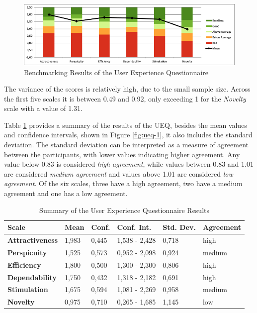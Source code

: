\begin{figure}[htb]
	\includegraphics[width=\textwidth]{figures/ueq-2.png}
  \caption{Benchmarking Results of the User Experience Questionnaire}
  \label{fig:ueq-2}
\end{figure}

The variance of the scores is relatively high, due to the small sample size.
Across the first five scales it is between 0.49 and 0.92, only exceeding 1 for the \emph{Novelty} scale with a value of 1.31.

Table \ref{tab:ueq-summary} provides a summary of the results of the UEQ, besides the mean values and confidence intervals, shown in Figure \ref{fig:ueq-1}, it also includes the standard deviation.
The standard deviation can be interpreted as a measure of agreement between the participants, with lower values indicating higher agreement.
Any value below 0.83 is considered \emph{high agreement}, while values between 0.83 and 1.01 are considered \emph{medium agreement} and values above 1.01 are considered \emph{low agreement}.
Of the six scales, three have a high agreement, two have a medium agreement and one has a low agreement.

\begin{table}[htb]
  \centering
  \begin{tabularx}{\textwidth}{|X|l|l|l|l|l|}
  \hline
      \textbf{Scale} &  \textbf{Mean}  &  \textbf{Conf.} &  \textbf{Conf. Int.} &  \textbf{Std. Dev.} & \textbf{Agreement}\\ \hline
      \textbf{Attractiveness} & 1,983  & 0,445 & 1,538 - 2,428 & 0,718 & high \\ \hline
      \textbf{Perspicuity} & 1,525 & 0,573 & 0,952 - 2,098 & 0,924 & medium\\ \hline
      \textbf{Efficiency} & 1,800 & 0,500 & 1,300 - 2,300 & 0,806 & high \\ \hline
      \textbf{Dependability} & 1,750 & 0,432 & 1,318 - 2,182 & 0,691 & high \\ \hline
      \textbf{Stimulation} & 1,675 & 0,594 & 1,081 - 2,269 & 0,958 & medium \\ \hline
      \textbf{Novelty} & 0,975 & 0,710 & 0,265 - 1,685 & 1,145 & low \\ \hline
  \end{tabularx}
  \vspace{6pt}
  \caption{Summary of the User Experience Questionnaire Results}
  \label{tab:ueq-summary}
\end{table}

